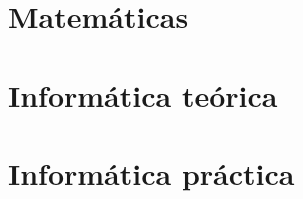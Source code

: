 \documentclass{book}
\begin{document}


\setcounter{tocdepth}{1}

\thispagestyle{plain}
\tableofcontents
\vspace*{\fill}
\doclicenseThis
\newpage
\thispagestyle{plain}


\part{Matemáticas}


\begin{comment}
\begin{prop}[Caracterizaciones de distancias asociadas a métricas] \label{prop:caract_distancias}
	
\end{prop}
\end{comment}












\part{Informática teórica}





 

\part{Informática práctica}




 

\printbibliography
\nocite{*}
\end{document}

